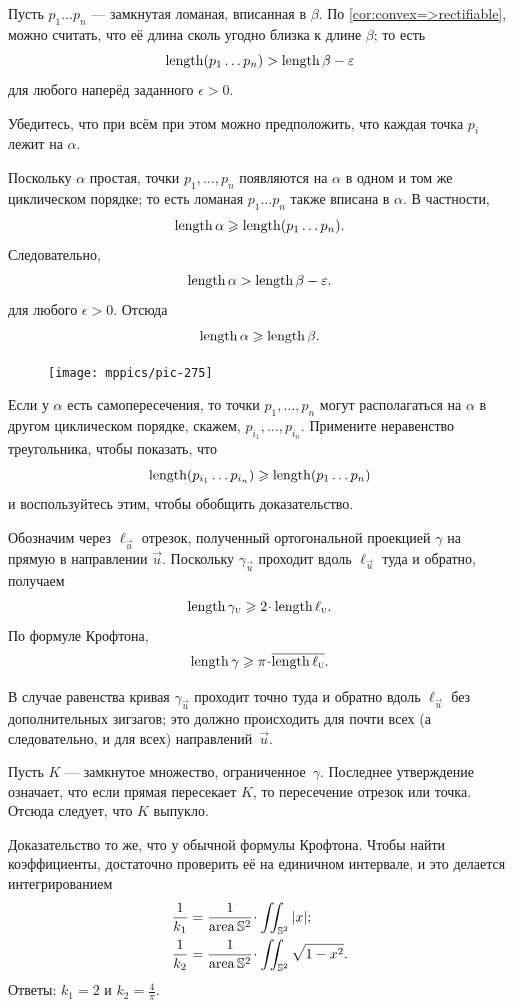 \begin{multicols}{2}
Пусть $p_1\dots p_n$ --- замкнутая ломаная, вписанная в $\beta$.
По \ref{cor:convex=>rectifiable}, можно считать, что её длина сколь угодно близка к длине $\beta$;
то есть
\[\mathop{\rm length}\nolimits (p_1\dots p_n)>\mathop{\rm length}\nolimits\beta-\varepsilon\]
для любого наперёд заданного $\epsilon>0$.

Убедитесь, что при всём при этом можно предположить, что каждая точка $p_i$ лежит на $\alpha$.

Поскольку $\alpha$ простая, точки $p_1,\dots,p_n$ появляются на $\alpha$ в одном и том же циклическом порядке;
то есть ломаная $p_1\dots p_n$ также вписана в $\alpha$.
В частности,
\[\mathop{\rm length}\nolimits\alpha\geqslant \mathop{\rm length}\nolimits (p_1\dots p_n).\]
Следовательно, 
\[\mathop{\rm length}\nolimits\alpha>\mathop{\rm length}\nolimits\beta-\varepsilon.\]
для любого $\epsilon>0$.
Отсюда
\[\mathop{\rm length}\nolimits\alpha\geqslant\mathop{\rm length}\nolimits\beta.\]

\begin{figure}
\vskip-0mm
\centering
\texttt{[image: mppics/pic-275]}
\vskip0mm
\end{figure}

Если у $\alpha$ есть самопересечения, то точки $p_1,\dots, p_n$ могут располагаться на $\alpha$ в другом циклическом порядке, скажем, $p_{i_1},\dots,p_{i_n}$.
Примените неравенство треугольника, чтобы показать, что
\[\mathop{\rm length}\nolimits(p_{i_1}\dots p_{i_n})\geqslant \mathop{\rm length}\nolimits (p_1\dots p_n)\]
и воспользуйтесь этим, чтобы обобщить доказательство.

Обозначим через $\ell_{\vec u}$ отрезок, 
полученный ортогональной проекцией $\gamma$ на прямую в направлении ${\vec u}$.
Поскольку $\gamma_{\vec u}$ проходит вдоль $\ell_{\vec u}$ туда и обратно, получаем
\[\length\gamma_{\vec u}\ge 2\cdot\length\ell_{\vec u}.\]
По формуле Крофтона, 
\[\length\gamma\ge \pi\cdot \overline{\length\ell_{\vec u}}.\]

В случае равенства кривая $\gamma_{\vec u}$ проходит точно туда и обратно вдоль $\ell_{\vec u}$ без дополнительных зигзагов;
это должно происходить для почти всех (а следовательно, и для всех) направлений~${\vec u}$.

Пусть $K$ --- замкнутое множество, ограниченное~$\gamma$.
Последнее утверждение означает, что если прямая пересекает $K$, то пересечение отрезок или точка.
Отсюда следует, что $K$ выпукло.

Доказательство то же, что у обычной формулы Крофтона.
Чтобы найти коэффициенты, достаточно проверить её на единичном интервале,
и это делается интегрированием
\begin{align*}
\frac1{k_1}&=\frac{1}{\area \mathbb{S}^2}\cdot\iint_{\mathbb{S}^2} |x|;
\\
\frac1{k_2}&=\frac{1}{\area \mathbb{S}^2}\cdot\iint_{\mathbb{S}^2} \sqrt{1-x^2}.
\end{align*}
Ответы: $k_1=2$ и $k_2=\tfrac4\pi$.


\end{multicols}
